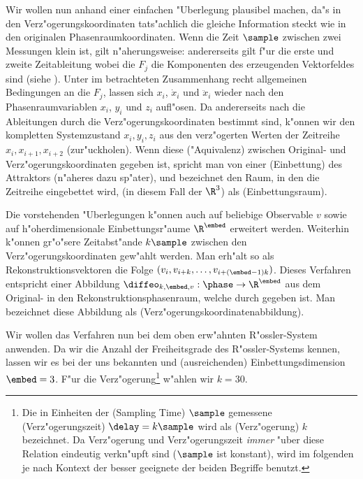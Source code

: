 Wir wollen nun anhand einer einfachen "Uberlegung 
plausibel machen, da"s in den Verz"ogerungskoordinaten
tats"achlich die gleiche Information steckt wie in den originalen Phasenraumkoordinaten.
Wenn die Zeit $\sample$ zwischen zwei Messungen klein ist, gilt n"aherungsweise:
andererseits gilt f"ur die erste und zweite Zeitableitung
wobei die $F_j$ die Komponenten des erzeugenden Vektorfeldes sind (siehe ).
Unter im betrachteten Zusammenhang recht allgemeinen Bedingungen an die $F_j$,
lassen sich $x_i$, $\dot x_i$ und $\ddot x_i$ wieder nach den Phasenraumvariablen $x_i$,
$y_i$ und $z_i$ aufl"osen.  Da andererseits nach  die Ableitungen durch die
Verz"ogerungskoordinaten bestimmt sind, k"onnen wir den kompletten Systemzustand
$x_i,y_i,z_i$ aus den verz"ogerten Werten der Zeitreihe $x_{i},x_{i+1},x_{i+2}$
\metapher(zur"uckholen). Wenn diese \naja("Aquivalenz) zwischen Original- und
Verz"ogerungskoordinaten gegeben ist, spricht man von einer \begriff(Einbettung) des
Attraktors (n"aheres dazu sp"ater), und bezeichnet den Raum, in den die Zeitreihe
eingebettet wird, (in diesem Fall der $\R^3$) als \begriff(Einbettungsraum).


Die vorstehenden "Uberlegungen k"onnen auch auf beliebige Observable $v$ sowie auf h"oherdimensionale
Einbettungsr"aume $\R^\embed$ erweitert werden. Weiterhin k"onnen gr"o"sere
Zeit\-ab\-st"ande $k\sample$ zwischen den Verz"ogerungskoordinaten gew"ahlt werden.  Man
erh"alt so als Rekonstruktionsvektoren die Folge $(v_{i},
v_{i+k},\dots,v_{i+(\embed-1)k})$. Dieses Verfahren entspricht einer
Abbildung $\diffeo_{k,\embed,v}:\phase\to\R^\embed$ aus dem Original- in den
Rekonstruktionsphasenraum, welche durch
gegeben ist. Man bezeichnet diese Abbildung  als \begriff(Verz"ogerungskoordinatenabbildung).

Wir wollen das Verfahren nun bei dem oben erw"ahnten R"ossler-System anwenden.  Da wir die
Anzahl der Freiheitsgrade des R"ossler-Systems kennen, lassen wir es bei der uns bekannten
und \naja(ausreichenden) Einbettungsdimension $\embed=3$. F"ur die Verz"ogerung\footnote{
  Die in Einheiten der \begriff(Sampling Time) $\sample$ gemessene
  \begriff(Verz"ogerungszeit) $\delay=k\sample$ wird als \begriff(Verz"ogerung) $k$
  bezeichnet. Da Verz"ogerung und Verz"ogerungszeit {\em immer} "uber diese Relation
  eindeutig verkn"upft sind ($\sample$ ist konstant), wird im folgenden je nach Kontext
  der besser geeignete der beiden Begriffe benutzt.} w"ahlen wir $k=30$.

